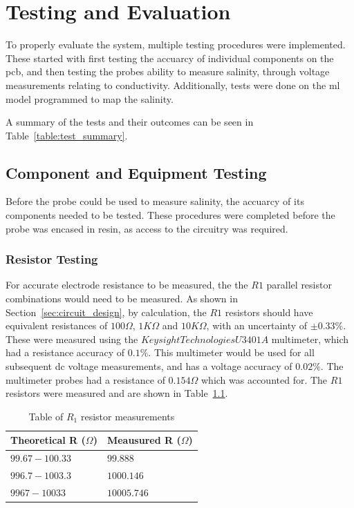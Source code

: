 \chapter{Testing and Evaluation}

To properly evaluate the system, multiple testing procedures were implemented.
These started with first testing the accuarcy of individual components on the \gls{pcb}, and then testing the probes ability to measure salinity, through voltage measurements relating to conductivity.
Additionally, tests were done on the \gls{ml} model programmed to map the salinity.

A summary of the tests and their outcomes can be seen in Table~\ref{table:test_summary}. %


\section{Component and Equipment Testing}
Before the probe could be used to measure salinity, the accuarcy of its components needed to be tested.
These procedures were completed before the probe was encased in resin, as access to the circuitry was required.

\subsection{Resistor Testing}
For accurate electrode resistance to be measured, the the $R1$ parallel resistor combinations would need to be measured.
As shown in Section~\ref{sec:circuit_design}, by calculation, the $R1$ resistors should have equivalent resistances of $100\Omega$, $1K\Omega$ and $10K\Omega$, with an uncertainty of $\pm0.33\%$.
These were measured using the $Keysight Technologies U3401A$ multimeter, which had a resistance accuracy of $0.1\%$.
This multimeter would be used for all subsequent \gls{dc} voltage measurements, and has a voltage accuracy of $0.02\%$.
The multimeter probes had a resistance of $0.154\Omega$ which was accounted for.
The $R1$ resistors were measured and are shown in Table~\ref{table:resistance_test}.


\begingroup
    \renewcommand{\arraystretch}{1.8} %
    \begin{table}[h!]
        \centering
            \begin{tabular}{|>{\centering\arraybackslash}p{5cm}|
                >{\centering\arraybackslash}m{5cm}|}
            \hline
            Theoretical R ($\Omega$) & Meausured R ($\Omega$) \\ \hline
            $99.67-100.33$ & $99.888$ \\ \hline
            $996.7-1003.3$ & $1000.146$ \\ \hline
            $9967-10033$ & $10005.746$ \\ \hline
            \end{tabular}
        \caption{Table of $R_1$ resistor measurements}
        \label{table:resistance_test}
    \end{table}
\endgroup

